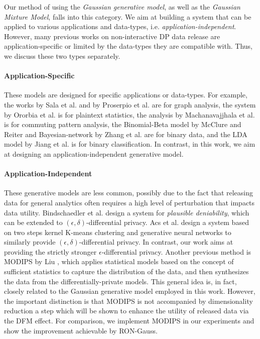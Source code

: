 \documentclass[USenglish,oneside,twocolumn]{article}
\theoremstyle{definition}
\theoremstyle{remark}
\theoremstyle{plain}
\theoremstyle{plain}
\begin{document}
Our method of using the \emph{Gaussian generative model}, as well as the \emph{Gaussian
Mixture Model}, falls into this category. We aim at building a system
that can be applied to various applications and data-types,
i.e. \emph{application-independent}. However, many previous
works on non-interactive DP data release are application-specific
or limited by the data-types they are compatible with. Thus, we discuss
these two types separately.

\vspace{-1em}
\paragraph{Application-Specific}

These models are designed for specific applications or data-types.
For example, the works by Sala et al. \cite{RefWorks:238} and by
Proserpio et al. \cite{RefWorks:187} are for graph analysis, the
system by Ororbia et al. \cite{RefWorks:334} is for plaintext statistics,
the analysis by Machanavajjhala et al. \cite{RefWorks:333} is for
commuting pattern analysis, the Binomial-Beta model by McClure and
Reiter \cite{RefWorks:371} and Bayesian-network by Zhang et al. \cite{RefWorks:335}
are for binary data, and the LDA model by Jiang et al. \cite{RefWorks:339}
is for binary classification. In contrast, in this work, we aim at designing an application-independent generative model.

\vspace{-1em}
\paragraph{Application-Independent}

These generative models are less common, possibly due to the fact
that releasing data for general analytics often requires a high level
of perturbation that impacts data utility. Bindschaedler et al. \cite{RefWorks:336}
design a system for \emph{plausible deniability}, which can be extended
to $(\epsilon,\delta)$-differential privacy. Acs et al. \cite{RefWorks:476}
design a system based on two steps \textendash{} kernel K-means clustering
and generative neural networks \textendash{} to similarly provide
$(\epsilon,\delta)$-differential privacy. In contrast, our work aims
at providing the strictly stronger $\epsilon$-differential privacy.
Another previous method is MODIPS by Liu \cite{RefWorks:372}, which
applies statistical models based on the concept of sufficient statistics
to capture the distribution of the data, and then synthesizes the
data from the differentially-private models. This general idea is, in fact, closely related to the Gaussian generative
model employed in this work. However, the important distinction is that
MODIPS is not accompanied by dimensionality reduction \textendash{} a step which
will be shown to enhance the utility of released
data via the DFM effect. For comparison, we implement MODIPS in our experiments and show the improvement achievable by RON-Gauss.
\end{document}
